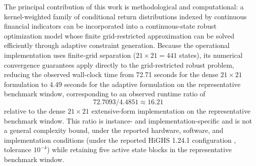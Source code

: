 \documentclass[smallextended]{svjour3}
\begin{document}
The principal contribution of this work is methodological and computational: a kernel-weighted family of conditional return distributions indexed by continuous financial indicators can be incorporated into a continuous-state robust optimization model whose finite grid-restricted approximation can be solved efficiently through adaptive constraint generation. Because the operational implementation uses finite-grid separation ($21\times21 = 441$ states), its numerical convergence guarantees apply directly to the grid-restricted robust problem, reducing the observed wall-clock time from 72.71 seconds for the dense
$21\times21$ formulation to 4.49 seconds for the adaptive formulation on
the representative benchmark window, corresponding to an observed runtime ratio of
\[
72.7093/4.4851\approx16.21
\]
relative to the dense $21\times21$ extensive-form implementation on the representative benchmark window. This ratio is instance- and implementation-specific and is not a general complexity bound, under the reported hardware, software, and
implementation conditions (under the reported HiGHS 1.24.1 configuration \cite{highs2022}, tolerance $10^{-4}$) while retaining five active state blocks in the representative benchmark window.
\end{document}
